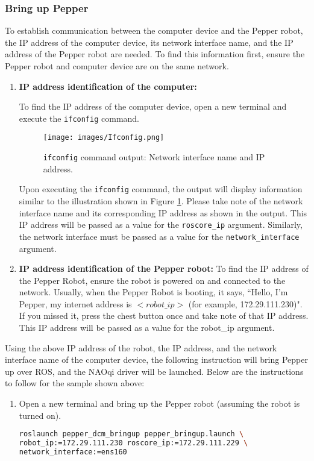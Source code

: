 \documentclass{CSSRforAfrica}
\begin{document}
{\subsubsection*{Bring up Pepper}
{
\label{bup}
To establish communication between the computer device and the Pepper robot, the IP address of the computer device, its network interface name, and the IP address of the Pepper robot are needed. To find this information first, ensure the Pepper robot and computer device are on the same network.

\begin{enumerate}
\item \textbf{IP address identification of the computer:}
{
\label{ipsystem}
To find the IP address of the computer device, open a new terminal and execute the \texttt{ifconfig} command.

\begin{figure}[!hbpt]
	\centering
	\texttt{[image: images/Ifconfig.png]}
	\caption{\texttt{ifconfig} command output: Network interface name and IP address.}
	\label{fig:ifconfig}
\end{figure}

Upon executing the \texttt{ifconfig} command, the output will display information similar to the illustration shown in Figure \ref{fig:ifconfig}. Please take note of the network interface name and its corresponding IP address as shown in the output. This IP address will be passed as a value for the \texttt{roscore\_ip} argument. Similarly, the network interface must be passed as a value for the \texttt{network\_interface} argument.} 

\item \textbf{IP address identification of the Pepper robot:}
To find the IP address of the Pepper Robot, ensure the robot is powered on and connected to the network. Usually, when the Pepper Robot is booting, it says, ``Hello, I'm Pepper, my internet address is $<robot\_ip >$ (for example, 172.29.111.230)". If you missed it, press the chest button once and take note of that IP address. This IP address will be passed as a value for the robot\_ip argument.

\end{enumerate}
\noindent Using the above IP address of the robot, the IP address, and the network interface name of the computer device, the following instruction will bring Pepper up over ROS, and the NAOqi driver will be launched. Below are the instructions to follow for the sample shown above:

\begin{enumerate}
\item Open a new terminal and bring up the Pepper robot (assuming the robot is turned on).
\begin{lstlisting}[style=withoutNumbering, language=bash]
roslaunch pepper_dcm_bringup pepper_bringup.launch \
robot_ip:=172.29.111.230 roscore_ip:=172.29.111.229 \
network_interface:=ens160
\end{lstlisting}


\end{enumerate}}}
\end{document}

